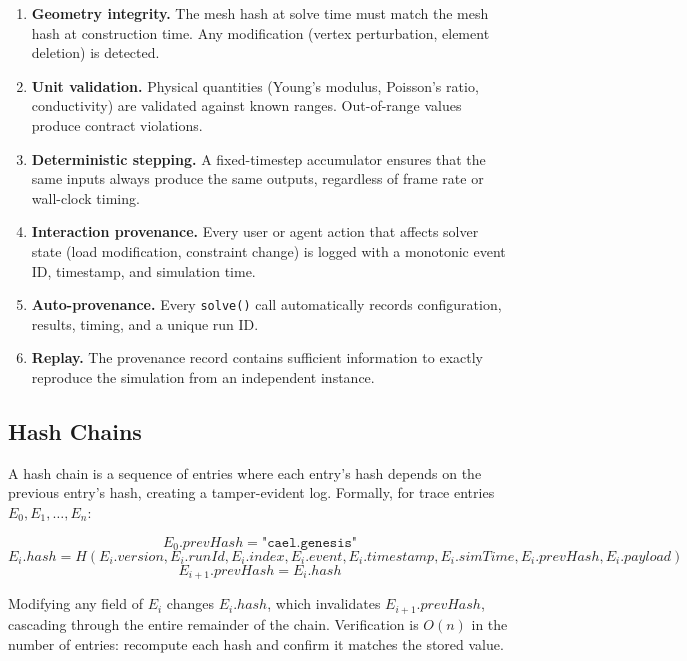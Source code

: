 \documentclass[letterpaper,twocolumn,10pt]{article}
\begin{document}
\begin{enumerate}[nosep,leftmargin=*]
\item \textbf{Geometry integrity.} The mesh hash at solve time must match the
  mesh hash at construction time. Any modification (vertex perturbation,
  element deletion) is detected.
\item \textbf{Unit validation.} Physical quantities (Young's modulus,
  Poisson's ratio, conductivity) are validated against known ranges.
  Out-of-range values produce contract violations.
\item \textbf{Deterministic stepping.} A fixed-timestep accumulator ensures
  that the same inputs always produce the same outputs, regardless of
  frame rate or wall-clock timing.
\item \textbf{Interaction provenance.} Every user or agent action that
  affects solver state (load modification, constraint change) is logged
  with a monotonic event ID, timestamp, and simulation time.
\item \textbf{Auto-provenance.} Every \texttt{solve()} call automatically
  records configuration, results, timing, and a unique run ID.
\item \textbf{Replay.} The provenance record contains sufficient information
  to exactly reproduce the simulation from an independent instance.
\end{enumerate}

\subsection{Hash Chains}

A hash chain is a sequence of entries where each entry's hash depends on the
previous entry's hash, creating a tamper-evident log. Formally, for trace
entries $E_0, E_1, \ldots, E_n$:

\begin{equation}
  E_0.\mathit{prevHash} = \texttt{"cael.genesis"}
\end{equation}
\begin{equation}
  E_i.\mathit{hash} = H(E_i.\mathit{version}, E_i.\mathit{runId}, E_i.\mathit{index}, E_i.\mathit{event}, E_i.\mathit{timestamp}, E_i.\mathit{simTime}, E_i.\mathit{prevHash}, E_i.\mathit{payload})
\end{equation}
\begin{equation}
  E_{i+1}.\mathit{prevHash} = E_i.\mathit{hash}
\end{equation}

\noindent Modifying any field of $E_i$ changes $E_i.\mathit{hash}$, which
invalidates $E_{i+1}.\mathit{prevHash}$, cascading through the entire
remainder of the chain. Verification is $O(n)$ in the number of entries:
recompute each hash and confirm it matches the stored value.
\end{document}
